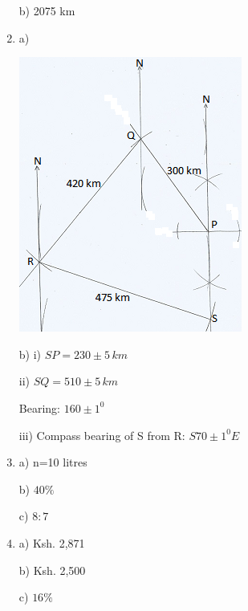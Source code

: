 \documentclass[
  a4paperpaper,
]{scrbook}
\begin{document}
\begin{tcolorbox}
\begin{enumerate}
  b) 2075 km
\item
  a)

  \includegraphics{figures/M3N19.png}

  b) i) \(SP=230\pm5\,km\)

  ii) \(SQ=510\pm5\,km\)

  Bearing: \(160\pm1^0\)

  iii) Compass bearing of S from R: \(S70\pm1^0E\)
\item
  a) n=10 litres

  b) \(40\%\)

  c) \(8:7\)
\item
  a) Ksh. 2,871

  b) Ksh. 2,500

  c) \(16\%\)
\end{enumerate}

\end{tcolorbox}
\end{document}

